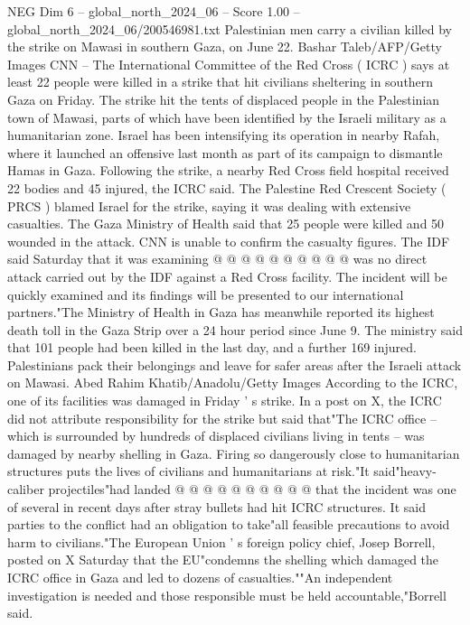 \begin{textsample}{NEG Dim 6 – global\_north\_2024\_06 – Score 1.00 – global\_north\_2024\_06/200546981.txt}  \label{ex:f6_neg_315}
Palestinian men carry a civilian killed by the strike on Mawasi in southern Gaza, on June 22.
Bashar Taleb/AFP/Getty Images CNN -- The International Committee of the Red Cross ( ICRC ) says at least 22 people were killed in a strike that hit civilians sheltering in southern Gaza on Friday.
The strike hit the tents of displaced people in the Palestinian town of Mawasi, parts of which have been identified by the Israeli military as a humanitarian zone.
Israel has been intensifying its operation in nearby Rafah, where it launched an offensive last month as part of its campaign to dismantle Hamas in Gaza.
Following the strike, a nearby Red Cross field hospital received 22 bodies and 45 injured, the ICRC said.
The Palestine Red Crescent Society ( PRCS ) blamed Israel for the strike, saying it was dealing with extensive casualties.
The Gaza Ministry of Health said that 25 people were killed and 50 wounded in the attack.
CNN is unable to confirm the casualty figures.
The IDF said Saturday that it was examining @ @ @ @ @ @ @ @ @ @ was no direct attack carried out by the IDF against a Red Cross facility.
The incident will be quickly examined and its findings will be presented to our international partners."The Ministry of Health in Gaza has meanwhile reported its highest death toll in the Gaza Strip over a 24 hour period since June 9.
The ministry said that 101 people had been killed in the last day, and a further 169 injured.
Palestinians pack their belongings and leave for safer areas after the Israeli attack on Mawasi.
Abed Rahim Khatib/Anadolu/Getty Images According to the ICRC, one of its facilities was damaged in Friday ' s strike.
In a post on X, the ICRC did not attribute responsibility for the strike but said that"The ICRC office -- which is surrounded by hundreds of displaced civilians living in tents -- was damaged by nearby shelling in Gaza.
Firing so dangerously close to humanitarian structures puts the lives of civilians and humanitarians at risk."It said"heavy-caliber projectiles"had landed @ @ @ @ @ @ @ @ @ @ that the incident was one of several in recent days after stray bullets had hit ICRC structures.
It said parties to the conflict had an obligation to take"all feasible precautions to avoid harm to civilians."The European Union ' s foreign policy chief, Josep Borrell, posted on X Saturday that the EU"condemns the shelling which damaged the ICRC office in Gaza and led to dozens of casualties.""An independent investigation is needed and those responsible must be held accountable,"Borrell said.

\end{textsample}
